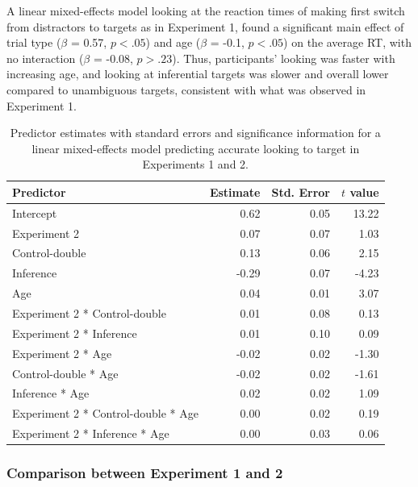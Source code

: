 \documentclass[a4paper,man,apacite,floatsintext]{apa6}
\begin{document}
A linear mixed-effects model looking at the reaction times of making
first switch from distractors to targets as in Experiment 1, found a
significant main effect of trial type (\(\beta\) = 0.57, \(p <.05\)) and
age (\(\beta\) = -0.1, \(p <.05\)) on the average RT, with no
interaction (\(\beta\) = -0.08, \(p >.23\)). Thus, participants' looking
was faster with increasing age, and looking at inferential targets was
slower and overall lower compared to unambiguous targets, consistent
with what was observed in Experiment 1.

\begin{table}[tb]
\centering
\begin{tabular}{lrrr}
 Predictor & Estimate & Std. Error & $t$ value \\ 
  \hline
Intercept & 0.62 & 0.05 & 13.22 \\ 
  Experiment 2 & 0.07 & 0.07 & 1.03 \\ 
  Control-double & 0.13 & 0.06 & 2.15 \\ 
  Inference & -0.29 & 0.07 & -4.23 \\ 
  Age & 0.04 & 0.01 & 3.07 \\ 
  Experiment 2 * Control-double & 0.01 & 0.08 & 0.13 \\ 
  Experiment 2 * Inference & 0.01 & 0.10 & 0.09 \\ 
  Experiment 2 * Age & -0.02 & 0.02 & -1.30 \\ 
  Control-double * Age & -0.02 & 0.02 & -1.61 \\ 
  Inference * Age & 0.02 & 0.02 & 1.09 \\ 
  Experiment 2 * Control-double * Age & 0.00 & 0.02 & 0.19 \\ 
  Experiment 2 * Inference * Age & 0.00 & 0.03 & 0.06 \\ 
   \hline
\end{tabular}
\caption{Predictor estimates with standard errors and significance information for a linear mixed-effects model predicting accurate looking to target in Experiments 1 and 2.} 
\label{tab:exp2_tab}
\end{table}

\subsubsection{Comparison between Experiment 1 and
2}\label{comparison-between-experiment-1-and-2}
\end{document}
